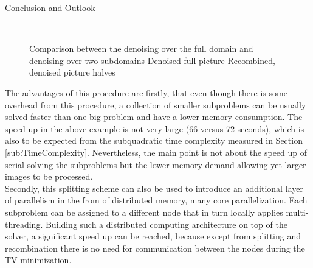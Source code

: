\begin{chapter}{Conclusion and Outlook}
\begin{figure}[h!]
    \centering
    \\
    \caption[Comparison full domain versus splitted domain denoising]{Comparison between the denoising
    over the full domain and denoising over two subdomains
	 Denoised full picture
	 Recombined, denoised picture halves
	\label{fig:splitting2}
    }
\end{figure}

The advantages of this procedure are firstly, that even though there is some overhead from this procedure, a collection of smaller subproblems can be usually solved faster than one big problem and have a lower memory consumption. The speed up in the above example
is not very large (66 versus 72 seconds), which is also to be expected from the subquadratic time complexity measured in 
Section \ref{sub:TimeComplexity}. Nevertheless, the main point is not about the speed up of serial-solving the subproblems but
the lower memory demand allowing yet larger images to be processed.\\

Secondly, this splitting scheme can also be used to introduce an additional layer of parallelism in the from of distributed memory, 
many core parallelization. Each subproblem can be assigned to a different node that in turn locally applies multi-threading.
Building such a distributed computing architecture on top of the solver, a significant speed up can be reached, because except
from splitting and recombination there is no need for communication between the nodes during the TV minimization.

\end{chapter}
